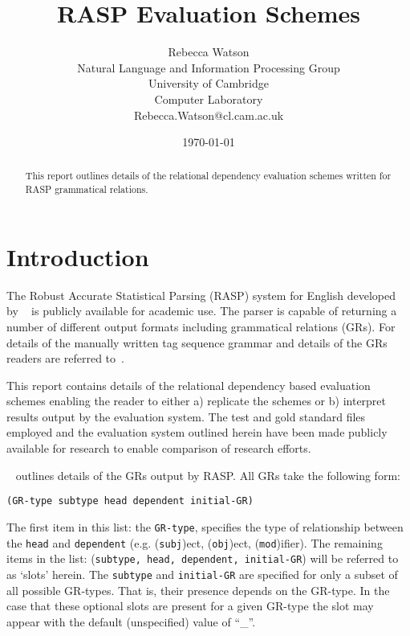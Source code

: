 \documentclass[10pt]{article}
\title{RASP Evaluation Schemes}
\author{Rebecca Watson\\
Natural Language and Information Processing Group\\
University of Cambridge\\
Computer Laboratory\\
Rebecca.Watson@cl.cam.ac.uk}
\date{\today}
\newcommand{\stt}[1]{{\small\texttt{#1}}}
\begin{document}
\maketitle
\begin{abstract}
This report outlines details of the relational
dependency evaluation schemes written for RASP grammatical
relations.
\end{abstract}

\setcounter{tocdepth}{2}

\tableofcontents


\newpage

\section{Introduction}

The Robust Accurate Statistical Parsing (RASP) system 
for English developed by ~\citeyear{briscoe02} is 
publicly available for academic use. 
The parser is capable of returning
a number of different output formats including grammatical relations
(GRs). For details of the manually written tag sequence grammar 
and details of the GRs readers are referred to~\cite{briscoe05a}. 

This report contains details of the relational
dependency based evaluation schemes enabling the reader to either
a) replicate the schemes or 
b) interpret results output by the evaluation system.
The test and gold standard files employed %
and the evaluation system outlined herein have been made publicly available 
for research to enable comparison of research efforts.

~\citeyear{briscoe05a} outlines details of
the GRs output by RASP. 
All GRs take the following form:
\begin{verbatim}
(GR-type subtype head dependent initial-GR)
\end{verbatim}
The first item in this list: the \stt{GR-type}, specifies 
the type of relationship between the \stt{head}
and \stt{dependent} 
(e.g. (\stt{subj})ect, (\stt{obj})ect, (\stt{mod})ifier). 
The remaining items in the list:
(\stt{subtype, head, dependent, initial-GR}) will be
referred to as `slots' herein. 
The \stt{subtype} and \stt{initial-GR} are specified for only a subset of
all possible GR-types. That is, their presence depends on the GR-type. 
In the case that these optional 
slots are present for a given GR-type the slot may appear with 
the default (unspecified) value of ``\_''. 
\end{document}

